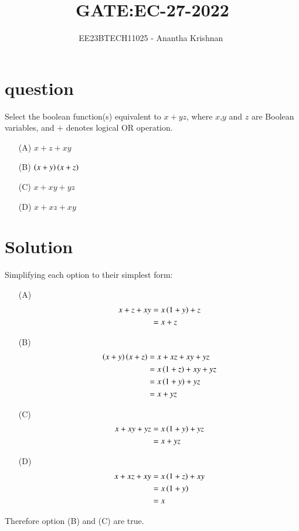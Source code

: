 \documentclass[journal,12pt,onecolumn]{IEEEtran}
\theoremstyle{remark}
\begin{document}

\vspace{3cm}

\title{GATE:EC-27-2022}
\author{EE23BTECH11025 - Anantha Krishnan $^{}$%
}
\maketitle
\bigskip



\section{question}
Select the boolean function(s) equivalent to $x+yz$, where $x$,$y$ and $z$ are Boolean variables, and $+$ denotes logical OR operation.
\begin{enumerate}
    \item [(A)] $x+z+xy$
    \item [(B)] $\left(x+y\right)\left(x+z\right)$
    \item [(C)] $x+xy+yz$
    \item [(D)] $x+xz+xy$
\end{enumerate}

\section{Solution}
Simplifying each option to their simplest form:
\begin{enumerate}
    \item [(A)]
    \begin{align}
        x+z+xy &= x\left(1+y\right) +z\\
        &=x+z
    \end{align}
    \item [(B)]
    \begin{align}
    \left(x+y\right)\left(x+z\right) &= x+xz+xy+yz\\
    &=x\left(1+z\right)+xy+yz\\
    &=x\left(1+y\right)+yz\\
    &=x+yz
        \end{align}
    \item [(C)]
    \begin{align}
        x+xy+yz &= x\left(1+y\right)+yz\\
        &=x+yz
    \end{align}
    \item [(D)]
    \begin{align}
        x+xz+xy &= x\left(1+z\right)+xy\\
        &=x\left(1+y\right)\\
        &=x
    \end{align}
\end{enumerate}
Therefore option (B) and (C) are true.
 
\end{document}
